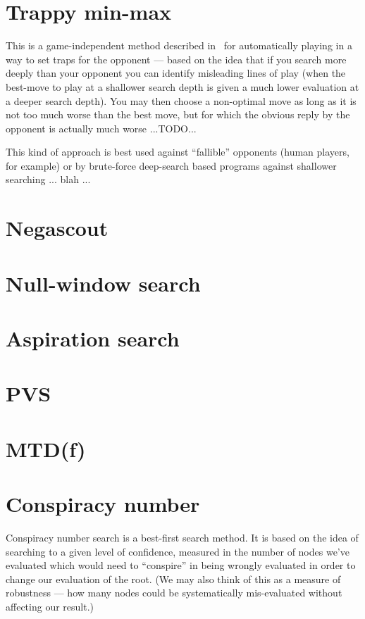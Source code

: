 \documentclass[10pt,dvipdfmx]{report}
\begin{document}
\section{Trappy min-max}

This is a game-independent method described in~\cite{gordonreda}
for automatically playing in a way to set traps for the opponent
--- based on the idea that if you search more deeply than your opponent you can
identify misleading lines of play (when the best-move to play at a shallower
search depth is given a much lower evaluation at a deeper search depth).
You may then choose a non-optimal move as long as it is not too much worse than the
best move, but for which the obvious reply by the opponent is actually much worse ...TODO...

This kind of approach is best used against ``fallible'' opponents (human players, for example)
or by brute-force deep-search based programs against shallower searching ... blah ...

\section{Negascout}
\section{Null-window search}
\section{Aspiration search}
\section{PVS}
\section{MTD(f)}

\section{Conspiracy number}
Conspiracy number search is a best-first search method.
It is based on the idea of searching to a given level of confidence, measured
in the number of nodes we've evaluated which would need to ``conspire'' in being
wrongly evaluated in order to change our evaluation of the root.  (We may also think
of this as a measure of robustness --- how many nodes could be systematically mis-evaluated
without affecting our result.)
\end{document}
